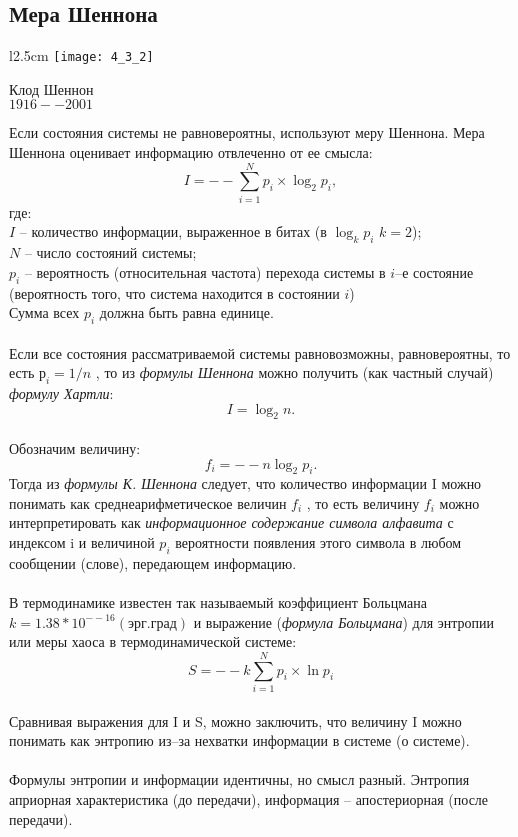 \subsection{Мера Шеннона }
\begin{wrapfigure}[12]{l}{2.5cm}
\texttt{[image: 4\_3\_2]}
\begin{center}
\footnotesize{Клод Шеннон}
\\\footnotesize{$1916 -- 2001$}
\end{center}
\end{wrapfigure}

Если состояния системы не равновероятны, используют меру Шеннона. Мера Шеннона оценивает информацию отвлеченно от ее смысла:
$$I = -- \sum^{N}_{i=1}p_{i}\times \log_{2}p_{i},$$ где:
\\$I$ -- количество информации, выраженное в битах (в $\log_{k}p_{i}$ $k = 2$);
\\$N$ -- число состояний системы;
\\$p_{i}$ -- вероятность (относительная частота) перехода системы в $i$--е состояние (вероятность того, что система находится в состоянии $i$) \\Сумма всех $p_{i}$ должна быть равна единице.\\
\\Если все состояния рассматриваемой системы равновозможны, равновероятны, то есть $р_i = 1/n$ , то из \emph{формулы Шеннона} можно получить (как частный случай) \emph{формулу Хартли}:
$$I = \log_{2}n.$$
\\Обозначим величину:
$$f_i = --n\log_{2}p_i.$$
\newpage
Тогда из \emph{формулы К. Шеннона} следует, что количество информации I можно понимать как среднеарифметическое величин $f_i$ , то есть величину $f_i$ можно интерпретировать как \emph{информационное содержание символа алфавита} с индексом i и величиной $p_i$ вероятности появления этого символа в любом сообщении (слове), передающем информацию.\\
\\ В термодинамике известен так называемый коэффициент Больцмана $k = 1.38 * 10^{--16} (эрг.град)$ и выражение (\emph{формула Больцмана}) для энтропии или меры хаоса в термодинамической системе:
$$ S = --k \sum^{N}_{i=1}p_{i}\times \ln{p_{i}}$$
\\ Сравнивая выражения для I и S, можно заключить, что величину I можно понимать как энтропию из--за нехватки информации в системе (о системе).\\
\\Формулы энтропии и информации идентичны, но смысл разный. Энтропия априорная характеристика (до передачи), информация – апостериорная (после передачи).\\
